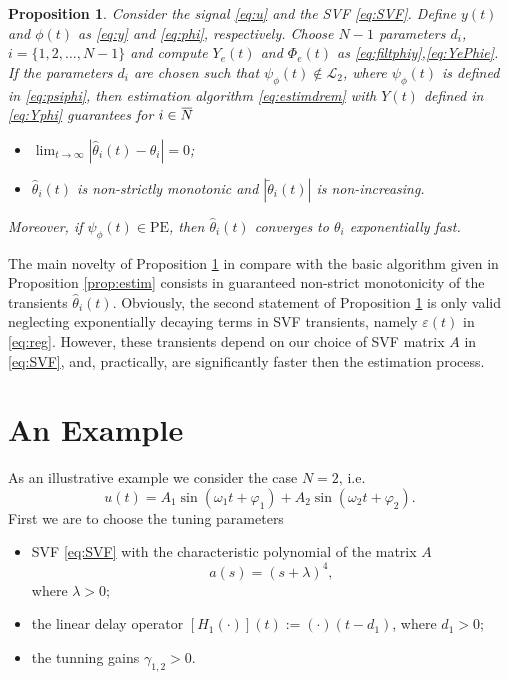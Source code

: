 \documentclass[journal, onecolumn]{IEEEtran}
\newtheorem{prop}{Proposition}
\newcommand{\overbar}[1]{\mkern 1.5mu\overline{\mkern-1.5mu#1\mkern-1.5mu}\mkern 1.5mu}
\newcommand{\iinb}{i\in\overbar{N}}
\newcommand{\tth}{\tilde{\theta}}
\begin{document}
\begin{prop} \label{prop:DREMEstim}
Consider the signal \eqref{eq:u} and the SVF \eqref{eq:SVF}. Define $y(t)$ and $\phi(t)$ as \eqref{eq:y} and \eqref{eq:phi}, respectively. Choose $N-1$ parameters $d_i$, $i=\{1, 2, \ldots, N-1\}$ and compute $Y_e(t)$ and $\Phi_e(t)$ as \eqref{eq:filtphiy},\eqref{eq:YePhie}. If the parameters $d_i$ are chosen such that $\psi_\phi(t) \notin \mathcal{L}_2$, where $\psi_\phi(t)$ is defined in \eqref{eq:psiphi}, then  estimation algorithm \eqref{eq:estimdrem} with $Y(t)$ defined in \eqref{eq:Yphi} guarantees for $\iinb$
\begin{itemize}
	\item $\lim_{t\to\infty}{|\hat\theta_i(t)-\theta_i|}=0$;
	\item $\hat{\theta}_i(t)$ is non-strictly monotonic and $|\tth_i(t)|$ is non-increasing.
\end{itemize}
Moreover, if $\psi_\phi(t) \in \mbox{PE}$, then $\hat\theta_i(t)$ converges to $\theta_i$ exponentially fast. \end{prop}

The main novelty of Proposition \ref{prop:DREMEstim} in compare with the basic algorithm given in Proposition \ref{prop:estim} consists in guaranteed non-strict monotonicity of the transients $\hat{\theta}_i(t)$. Obviously, the second statement of Proposition \ref{prop:DREMEstim} is only valid neglecting exponentially decaying terms in SVF transients, namely $\varepsilon(t)$ in \eqref{eq:reg}. However, these transients depend on our choice of SVF matrix $A$ in \eqref{eq:SVF}, and, practically, are significantly faster then the estimation process.
\section{An Example} \label{sec:sim}
As an illustrative example we consider the case $N=2$, i.e.
\begin{equation} \label{eq:uN2}
	u(t) = A_1\sin(\omega_1t+\varphi_1) + A_2\sin(\omega_2 t +\varphi_2).
\end{equation}
First we are to choose the tuning parameters
\begin{itemize}
\item SVF \eqref{eq:SVF} with the characteristic polynomial of the matrix $A$
\[
	a(s) = \left(s+\lambda\right)^4,
\]
where $\lambda>0$;
\item the linear delay operator $[H_1(\cdot)](t):=(\cdot)(t-d_1)$, where $d_1>0$;
\item the tunning gains $\gamma_{1,2}>0$. 
\end{itemize}
\end{document}

